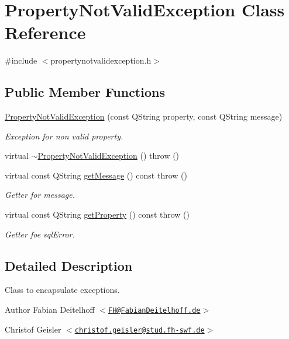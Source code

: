\hypertarget{classPropertyNotValidException}{
\section{\-Property\-Not\-Valid\-Exception \-Class \-Reference}
\label{d8/df5/classPropertyNotValidException}
}


{\ttfamily \#include $<$propertynotvalidexception.\-h$>$}

\subsection*{\-Public \-Member \-Functions}
\begin{DoxyCompactItemize}
\item 
\hyperlink{classPropertyNotValidException_a1597e12c33e8b6080dbf3bd057e03bb8}{\-Property\-Not\-Valid\-Exception} (const \-Q\-String property, const \-Q\-String message)
\begin{DoxyCompactList}\small\item\em \-Exception for non valid property. \end{DoxyCompactList}\item 
virtual \hyperlink{classPropertyNotValidException_ac44b59af3ea710aa74ca523b36bda7ff}{$\sim$\-Property\-Not\-Valid\-Exception} ()  throw ()
\item 
virtual const \-Q\-String \hyperlink{classPropertyNotValidException_a66d861efc67428d56e0196f8f5b33d26}{get\-Message} () const   throw ()
\begin{DoxyCompactList}\small\item\em \-Getter for message. \end{DoxyCompactList}\item 
virtual const \-Q\-String \hyperlink{classPropertyNotValidException_afce6ddb37d69ac02017d4f7300cdaee1}{get\-Property} () const   throw ()
\begin{DoxyCompactList}\small\item\em \-Getter foe sql\-Error. \end{DoxyCompactList}\end{DoxyCompactItemize}


\subsection{\-Detailed \-Description}
\-Class to encapsulate exceptions.

\begin{DoxyAuthor}{\-Author}
\-Fabian \-Deitelhoff $<$\href{mailto:FH@FabianDeitelhoff.de}{\tt \-F\-H@\-Fabian\-Deitelhoff.\-de}$>$ 

\-Christof \-Geisler $<$\href{mailto:christof.geisler@stud.fh-swf.de}{\tt christof.\-geisler@stud.\-fh-\/swf.\-de}$>$ 
\end{DoxyAuthor}


